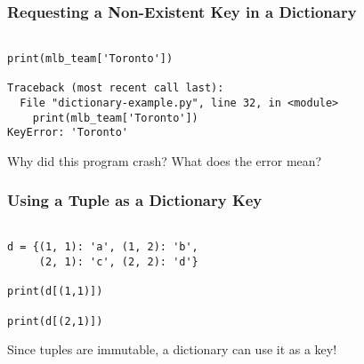 \documentclass[14pt,aspectratio=169]{beamer}
\begin{document}
%
\begin{frame}[fragile]
  \frametitle{Requesting a Non-Existent Key in a Dictionary}
  \begin{minipage}{6in}
    \vspace*{.25in}
    \begin{verbatim}

print(mlb_team['Toronto'])

Traceback (most recent call last):
  File "dictionary-example.py", line 32, in <module>
    print(mlb_team['Toronto'])
KeyError: 'Toronto'

    \end{verbatim}
  \end{minipage}
  \vspace*{.025in}
  \begin{center}
    \normalsize \noindent Why did this program crash? What does the error mean?\\
  \end{center}
\end{frame}

%
\begin{frame}[fragile]
  \frametitle{Using a Tuple as a Dictionary Key}
  \begin{minipage}{6in}
    \vspace*{.25in}
    \begin{verbatim}

d = {(1, 1): 'a', (1, 2): 'b',
     (2, 1): 'c', (2, 2): 'd'}

print(d[(1,1)])

print(d[(2,1)])

    \end{verbatim}
  \end{minipage}
  \vspace*{.025in}
  \begin{center}
    \normalsize \noindent Since tuples are immutable, a dictionary can use it as
    a key! \\
  \end{center}
\end{frame}
\end{document}
